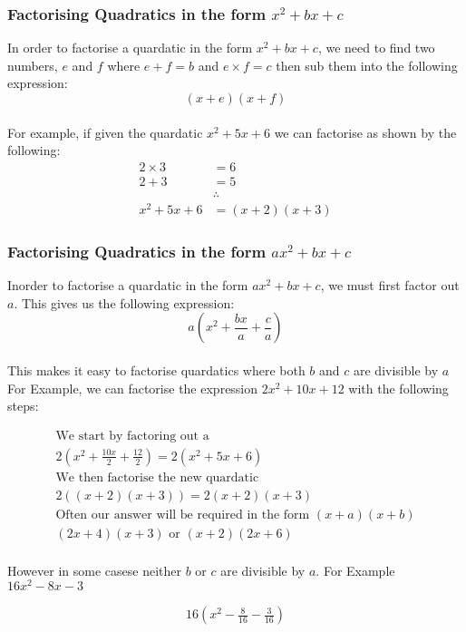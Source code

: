 \documentclass{article}
\begin{document}
\subsubsection{Factorising Quadratics in the form $x^2 + bx + c$}
In order to factorise a quardatic in the form $x^2 + bx + c$,
we need to find two numbers, $e$ and $f$ where $e + f = b$ and
$e \times f = c$ then sub them into the following expression:
\begin{equation}
	(x + e)(x + f)
\end{equation}
\\
For example, if given the quardatic $x^2 + 5x + 6$ we can factorise as shown by the following:
\begin{align*}
	2 \times 3 &= 6 \\
	2 + 3 &= 5 \\
	&\therefore \\
	x^2 + 5x + 6 &= (x + 2)(x + 3)
\end{align*}

\subsubsection{Factorising Quadratics in the form $ax^2 + bx + c$}
Inorder to factorise a quardatic in the form $ax^2 + bx +c$, we must first factor out $a$.
This gives us the following expression:
\begin{equation}
	a\left(x^2 + \frac{bx}{a} + \frac{c}{a} \right)
\end{equation}
\\
This makes it easy to factorise quardatics where both $b$ and $c$ are divisible by $a$
For Example, we can factorise the expression $2x^2 + 10x + 12$ with the following steps:

\begin{gather*}
	\text{We start by factoring out a}\\
	2\left(x^2 + \frac{10x}{2} + \frac{12}{2} \right) = 2(x^2 + 5x + 6)\\
	\text{We then factorise the new quardatic}\\
	2((x+2)(x+3)) = 2(x+2)(x+3)\\
	\text{Often our answer will be required in the form $(x + a)(x + b)$}\\
	(2x + 4)(x + 3) \text{ or } (x + 2)(2x + 6)
\end{gather*}
\\
However in some casese neither $b$ or $c$ are divisible by $a$.
For Example $16x^2 - 8x - 3$

\begin{gather*}
	16\left(x^2 - \frac{8}{16} - \frac{3}{16}\right)
\end{gather*}
\end{document}
